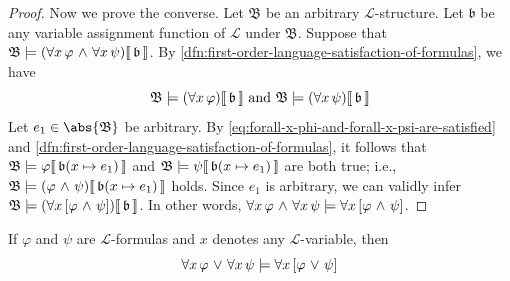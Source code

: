 \begin{proof}
    \vspace{0.3cm}
    \noindent
    Now we prove the converse.
    Let \( \mathfrak{B} \) be an arbitrary \( \mathcal{L} \)-structure. Let \( \mathfrak{b} \) be any variable assignment function of \( \mathcal{L} \) under \( \mathfrak{B} \).
    Suppose that \( \folwffsatisfaction{\mathfrak{B}}{\mleft( \forall x \, \varphi \,\,{\land}\,\, \forall x \, \psi \mright)}{\mathfrak{b}} \).
    By \cref{dfn:first-order-language-satisfaction-of-formulas}, we have
    \begin{equation}
        \label{eq:forall-x-phi-and-forall-x-psi-are-satisfied}
        \folwffsatisfaction{\mathfrak{B}}{\mleft( \forall x \, \varphi \mright)}{\mathfrak{b}} \ \text{and}
        \ \folwffsatisfaction{\mathfrak{B}}{\mleft( \forall x \, \psi \mright)}{\mathfrak{b}}
    \end{equation}
    Let \( e_{1} \in \abs{\mathfrak{B}} \) be arbitrary.
    By \eqref{eq:forall-x-phi-and-forall-x-psi-are-satisfied} and \cref{dfn:first-order-language-satisfaction-of-formulas}, it follows that
    \( \folwffsatisfaction{\mathfrak{B}}{\varphi}{ \folmodifiedvariableassignmentfunction{\mathfrak{b}}{x}{e_{1}}} \)
    and \( \folwffsatisfaction{\mathfrak{B}}{\psi}{ \folmodifiedvariableassignmentfunction{\mathfrak{b}}{x}{e_{1}}} \)
    are both true;
    i.e., \( \folwffsatisfaction{\mathfrak{B}}{\mleft( \varphi \,\,{\land}\,\, \psi \mright)}{ \folmodifiedvariableassignmentfunction{\mathfrak{b}}{x}{e_{1}} } \) holds.
    Since \( e_{1} \) is arbitrary, we can validly infer
    \( \folwffsatisfaction{\mathfrak{B}}{\mleft( \forall x \, \mleft[ \varphi \,\,{\land}\,\, \psi \mright] \mright)}{\mathfrak{b}} \).
    In other words, \( \forall x \, \varphi \,\,{\land}\,\, \forall x \, \psi \models \forall x \, \mleft[ \varphi \,\,{\land}\,\, \psi \mright] \).
\end{proof}

\begin{thm}
     \label{logical-consequence:universally-quantified-disjuncts-implies-universally-quantified-disjunction}
    If \( \varphi \) and \( \psi \) are \( \mathcal{L} \)-formulas and \( x \) denotes any \( \mathcal{L} \)-variable, then
    \begin{equation*}
        \forall x \, \varphi \,\,{\lor}\,\, \forall x \, \psi \models \forall x \, \mleft[ \varphi \,\,{\lor}\,\, \psi \mright]
    \end{equation*}
\end{thm}

